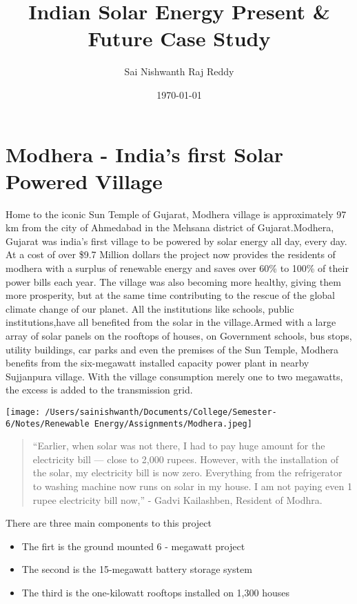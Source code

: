\documentclass[11pt]{article}
\author{Sai Nishwanth Raj Reddy}
\date{\today}
\title{Indian Solar Energy Present \& Future Case Study}
\begin{document}
\maketitle
\tableofcontents

\section{Modhera - India's first Solar Powered Village}
\label{sec:orga13c89d}
Home to the iconic Sun Temple of Gujarat, Modhera village is approximately 97 km from the city of Ahmedabad in the Mehsana district of Gujarat.Modhera, Gujarat was india's first village to be powered by solar energy all day, every day. At a cost of over \$9.7 Million dollars the project now provides the residents of modhera with a surplus of renewable energy and saves over 60\% to 100\% of their power bills each year. The village was also becoming more healthy, giving them more prosperity, but at the same time contributing to the rescue of the global climate change of our planet. All the institutions like schools, public institutions,have all benefited from the solar in the village.Armed with a large array of solar panels on the rooftops of houses, on Government schools, bus stops, utility buildings, car parks and even the premises of the Sun Temple, Modhera benefits from the six-megawatt installed capacity power plant in nearby Sujjanpura village. With the village consumption merely one to two megawatts, the excess is added to the transmission grid.


\begin{center}
\texttt{[image: /Users/sainishwanth/Documents/College/Semester-6/Notes/Renewable Energy/Assignments/Modhera.jpeg]}
\end{center}

\begin{quote}
“Earlier, when solar was not there, I had to pay huge amount for the electricity bill — close to 2,000 rupees. However, with the installation of the solar, my electricity bill is now zero. Everything from the refrigerator to washing machine now runs on solar in my house. I am not paying even 1 rupee electricity bill now,” - Gadvi Kailashben, Resident of Modhra.
\end{quote}


There are three main components to this project
\begin{itemize}
\item The firt is the ground mounted 6 - megawatt project
\item The second is the 15-megawatt battery storage system
\item The third is the one-kilowatt rooftops installed on 1,300 houses
\end{itemize}
\end{document}
